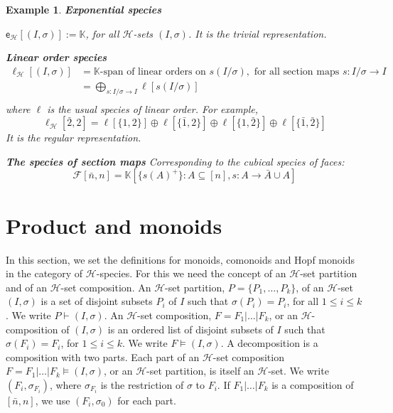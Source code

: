 \documentclass[11pt,reqno]{amsart}
\numberwithin{equation}{section}
\newtheorem{ex}[theorem]{Example}
\def\K{{\mathbb K}}
\def\H{{\mathcal{H}}}
\def\Cf{{\mathcal{C}}}
\def\eB{{\textsf{e}_{\H}}}
\def\lB{\ell_{\H}}
\def\F{\mathcal{F}}
\def\n{\bar{n},n}
\def\Is{(I,\sigma )}
\def\Im{I/\sigma}
\def\seI{s\colon I/\sigma\rightarrow I}
\begin{document}
\begin{ex}
{\bf Exponential species} 

$\eB[\Is]:=\K$, for all $\H$-sets $\Is$. It is the trivial representation.

{\bf Linear order species}
\begin{equation*}
\begin{aligned} 
\lB[\Is]&=\K\text{-span of linear orders on } s(\Im), \text{ for all section maps $\seI$}\\
&=\bigoplus_{\seI} \ell[s(\Im)]\\
\end{aligned}
\end{equation*}
where $\ell$ is the usual species of linear order. For example,
$$\lB[\bar{2},2]=\ell[\{1,2\}]\oplus \ell[\{\bar{1},2\}]\oplus\ell[\{1,\bar{2}\}]\oplus\ell[\{\bar{1},\bar{2}\}]$$
It is the regular representation.

{\bf The species of section maps}
Corresponding to the cubical species of faces:
$$\F[\n]=\K[\{s(A)^+\}: A\subseteq  [n], s\colon A\rightarrow \bar{A}\cup A]$$

\end{ex}







\section{Product and monoids}

In this section, we set the definitions for monoids, comonoids and Hopf monoids in the category of $\H$-species. For this we need the concept of an $\H$-set partition and of an $\H$-set composition. An $\H$-set partition, $P=\{P_1,\dots, P_k\}$, of an $\H$-set $(I,\sigma)$ is a set of disjoint subsets $P_i$ of $I$ such that $\sigma(P_i)=P_i$, for all $1\leq i\leq k$. We write $P\vdash (I,\sigma)$. An $\H$-set composition, $F=F_1|\dots |F_k$, or an $\H$-composition of $(I,\sigma)$ is an ordered list of disjoint subsets of $I$ such that $\sigma(F_i)=F_i$, for $1\leq i\leq k$. We write $F\models \Is$. A decomposition is a composition with two parts. Each part of an $\H$-set composition $F=F_1|\dots |F_k \models \Is$, or an $\H$-set partition, is itself an $\H$-set. We write $(F_i,\sigma_{F_i})$, where $\sigma_{F_i}$ is the restriction of $\sigma$ to $F_i$. If $F_1|\dots|F_k$ is a composition of $[\n]$, we use $(F_i,\sigma_0)$ for each part.
\end{document}
